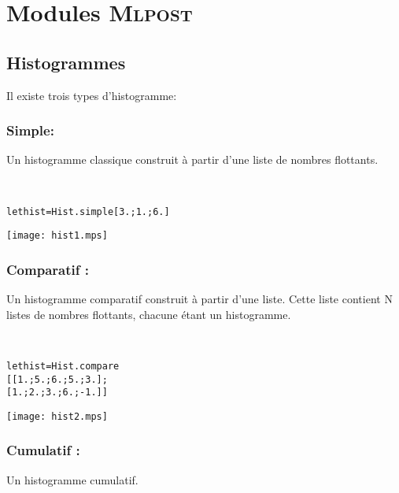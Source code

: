 \documentclass[a4paper,12pt]{article}
\newcommand{\mlpost}{\textsc{Mlpost}}
\begin{document}
\section{Modules \mlpost}


\subsection{Histogrammes}
Il existe trois types d'histogramme:

\subsubsection{Simple:}
Un histogramme classique construit à partir d'une liste de nombres
flottants.

~\\

\begin{minipage}{0.5\linewidth}
  \begin{alltt}
    let hist = Hist.simple [3.;1.;6.]
  \end{alltt}
\end{minipage}
\begin{minipage}{0.5\linewidth}
\begin{center}
\texttt{[image: hist1.mps]}
\end{center}
\end{minipage}

\subsubsection{Comparatif :} 
Un histogramme comparatif construit à partir d'une liste. Cette liste
contient N listes de nombres flottants, chacune étant un histogramme.

~\\

\begin{minipage}{0.5\linewidth}
  \begin{alltt}
    let hist = Hist.compare
    [[1.;5.;6.;5.;3.];
      [1.;2.;3.;6.;-1.]]
  \end{alltt}
\end{minipage}
\begin{minipage}{0.5\linewidth}
\begin{center}
\texttt{[image: hist2.mps]}
\end{center}
\end{minipage}

\subsubsection{Cumulatif :} 
Un histogramme cumulatif.
\end{document}
